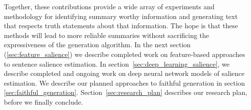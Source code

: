
Together, these contributions
provide a wide array of experiments and  methodology for identifying summary worthy information and 
generating text that respects truth statements about that information.
The hope is that these methods will lead to more reliable summaries
without sacrificing the expressiveness of the generation algorithm. 
In the next section (\autoref{sec:feature_salience}) 
we describe completed work on feature-based approaches to sentence salience estimation. 
In section~\ref{sec:deep_learning_salience}, we describe completed and ongoing
 work on deep neural network models
of salience estimation. We describe our planned approaches to faithful 
generation in section \ref{sec:faithful_generation}. 
Section~\ref{sec:research_plan} describes our research plan, before 
we finally conclude.




